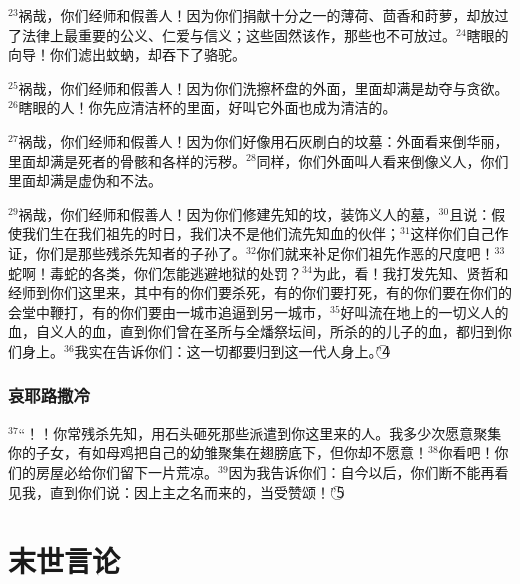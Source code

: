 $^{23}$祸哉，你们经师和\UL[法利塞]假善人！因为你们捐献十分之一的薄荷、茴香和莳萝，却放过了法律上最重要的公义、仁爱与信义；这些固然该作，那些也不可放过。$^{24}$瞎眼的向导！你们滤出蚊蚋，却吞下了骆驼。

$^{25}$祸哉，你们经师和\UL[法利塞]假善人！因为你们洗擦杯盘的外面，里面却满是劫夺与贪欲。$^{26}$瞎眼的\UL[法利塞]人！你先应清洁杯的里面，好叫它外面也成为清洁的。

$^{27}$祸哉，你们经师和\UL[法利塞]假善人！因为你们好像用石灰刷白的坟墓：外面看来倒华丽，里面却满是死者的骨骸和各样的污秽。$^{28}$同样，你们外面叫人看来倒像义人，你们里面却满是虚伪和不法。

$^{29}$祸哉，你们经师和\UL[法利塞]假善人！因为你们修建先知的坟，装饰义人的墓，$^{30}$且说：假使我们生在我们祖先的时日，我们决不是他们流先知血的伙伴；$^{31}$这样你们自己作证，你们是那些残杀先知者的子孙了。$^{32}$你们就来补足你们祖先作恶的尺度吧！$^{33}$蛇啊！毒蛇的各类，你们怎能逃避地狱的处罚？$^{34}$为此，看！我打发先知、贤哲和经师到你们这里来，其中有的你们要杀死，有的你们要打死，有的你们要在你们的会堂中鞭打，有的你们要由一城市追逼到另一城市，$^{35}$好叫流在地上的一切义人的血，自义人\UL[亚伯尔]的血，直到你们曾在圣所与全燔祭坛间，所杀的\UL[贝勒基雅]的儿子\UL[则加黎雅]的血，都归到你们身上。$^{36}$我实在告诉你们：这一切都要归到这一代人身上。”\textcircled{4}


\subsubsection{哀耶路撒冷}
$^{37}$“\UL[耶路撒冷]！\UL[耶路撒冷]！你常残杀先知，用石头砸死那些派遣到你这里来的人。我多少次愿意聚集你的子女，有如母鸡把自己的幼雏聚集在翅膀底下，但你却不愿意！$^{38}$你看吧！你们的房屋必给你们留下一片荒凉。$^{39}$因为我告诉你们：自今以后，你们断不能再看见我，直到你们说：因上主之名而来的，当受赞颂！”\textcircled{5}


\section{末世言论}


